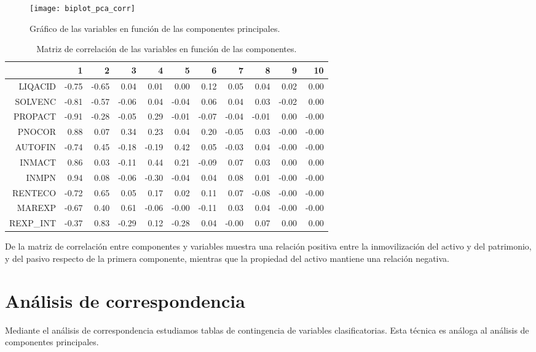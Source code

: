 \documentclass[a4paper,10pt]{article}
\begin{document}
\begin{figure}[h]
\centering
\texttt{[image: biplot\_pca\_corr]}
\caption{Gráfico de las variables en función de las componentes principales.}
\end{figure}

\begin{table}[ht]
\centering
\begin{tabular}{rrrrrrrrrrr}
  \hline
 & 1 & 2 & 3 & 4 & 5 & 6 & 7 & 8 & 9 & 10 \\ 
  \hline
LIQACID & -0.75 & -0.65 & 0.04 & 0.01 & 0.00 & 0.12 & 0.05 & 0.04 & 0.02 & 0.00 \\ 
  SOLVENC & -0.81 & -0.57 & -0.06 & 0.04 & -0.04 & 0.06 & 0.04 & 0.03 & -0.02 & 0.00 \\ 
  PROPACT & -0.91 & -0.28 & -0.05 & 0.29 & -0.01 & -0.07 & -0.04 & -0.01 & 0.00 & -0.00 \\ 
  PNOCOR & 0.88 & 0.07 & 0.34 & 0.23 & 0.04 & 0.20 & -0.05 & 0.03 & -0.00 & -0.00 \\ 
  AUTOFIN & -0.74 & 0.45 & -0.18 & -0.19 & 0.42 & 0.05 & -0.03 & 0.04 & -0.00 & -0.00 \\ 
  INMACT & 0.86 & 0.03 & -0.11 & 0.44 & 0.21 & -0.09 & 0.07 & 0.03 & 0.00 & 0.00 \\ 
  INMPN & 0.94 & 0.08 & -0.06 & -0.30 & -0.04 & 0.04 & 0.08 & 0.01 & -0.00 & -0.00 \\ 
  RENTECO & -0.72 & 0.65 & 0.05 & 0.17 & 0.02 & 0.11 & 0.07 & -0.08 & -0.00 & -0.00 \\ 
  MAREXP & -0.67 & 0.40 & 0.61 & -0.06 & -0.00 & -0.11 & 0.03 & 0.04 & -0.00 & -0.00 \\ 
  REXP\_INT & -0.37 & 0.83 & -0.29 & 0.12 & -0.28 & 0.04 & -0.00 & 0.07 & 0.00 & 0.00 \\ 
   \hline
\end{tabular}
\caption{Matriz de correlación de las variables en función de las componentes.}
\end{table}

De la matriz de correlación entre componentes y variables muestra una relación positiva entre la inmovilización del activo y del patrimonio, y del pasivo
respecto de la primera componente, mientras que la propiedad del activo mantiene una relación negativa.

\section{Análisis de correspondencia}

Mediante el análisis de correspondencia estudiamos tablas de contingencia de variables clasificatorias. Esta técnica es análoga al análisis de componentes
principales.
\end{document}
